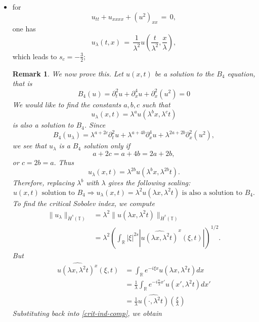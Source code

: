 \documentclass[12pt,reqno]{amsart}
\numberwithin{equation}{section}  %
\newcommand{\rr}{\mathbb{R}}
\newcommand{\ci}{\mathbb{T}}
\newcommand{\wh}{\widehat}
\newtheorem{remark}[theorem]{Remark}
\begin{document}
\begin{appendices}
\begin{itemize}
  \item for 
    \[
    u_{tt}+u_{xxxx}+(u^2)_{xx}\,=\,0,
    \]
    one has 
    \[
    u_{\lambda}(t,x)\,=\,\frac{1}{\lambda^2}u\left(\frac{t}{\lambda^2}, \frac{x}{\lambda}\right),
    \]
    which leads to $s_c=-\frac 32$;
\begin{framed}
\begin{remark}
We now prove this.
Let $u(x, t)$ be a solution to the $B_4$ equation, that is
%
$$
B_4(u)=
 \partial_t^2u + \partial^4_x u + \partial_x^2(u^2)  = 0
$$
%
We would like to find the constants
$a, b, c$ such that
\[
u_\lambda (x, t) = \lambda^a u(\lambda^b x, \lambda^c t)
\]
is also a solution to $B_4$.  Since 
$$
B_4(u_\lambda)=
\lambda^{a+2c} \partial_t^2u 
+
 \lambda^{a+4b} \partial^4_x u 
 +
  \lambda^{2a+2b}
  \partial_x^2(u^2),  
$$
we see that $u_\lambda$ is a $B_4$ solution only if
$$
a+2c=a+4b=2a+2b,
$$
or
$
c= 2b =a.
$
  Thus
\[
u_\lambda (x, t) = \lambda^{2b} u(\lambda^{b}x,  \lambda^{2b} t).
\]
%
%
Therefore, replacing  $ \lambda^b$ with  $ \lambda$ gives the following scaling:
%
\begin{equation}
\label{DP-scal}
\boxed{
u(x, t) \text{ solution to }  B_4
 \Longrightarrow 
u_\lambda (x, t) = \lambda^2 u(\lambda x, \lambda^2 t)  \text { is also a
solution to }  B_4. 
}
\end{equation}
\label{rem:scaling}
To find the critical Sobolev index, we compute
%
%
\begin{equation}
\begin{split}
  \| u_{\lambda} \|_{\dot{H}^s(\ci)} 
  & = \lambda^{2} \| u(\lambda x, \lambda^2 t) \|_{\dot{H}^{s}(\ci)}
  \\
  & = \lambda^{2} \left( \int_{\rr} | \xi |^{2s} | \wh{u (\lambda x,
  \lambda^{2} t)}^x (\xi, t)| \right)^{1/2}.
\end{split}
\label{crit-ind-comp}
\end{equation}
%
But
%
%
\begin{equation*}
\begin{split}
  \wh{u(\lambda x, \lambda^{2}t)^x}(\xi, t)
  & = \int_{\rr}e^{-i\xi x}u(\lambda x, \lambda^2 t) dx
  \\
  & = \frac{1}{\lambda} \int_{\rr}e^{-i \frac{n}{\lambda} x'}u(x',
  \lambda^{2} t) dx'
  \\
  & = \frac{1}{\lambda} \wh{u(\cdot, \lambda^{2}t)}(\frac{\xi}{\lambda})
\end{split}
\end{equation*}
%
%
Substituting back into \eqref{crit-ind-comp}, we obtain

\end{remark}
\end{framed}
\end{itemize}
\end{appendices}
\end{document}
